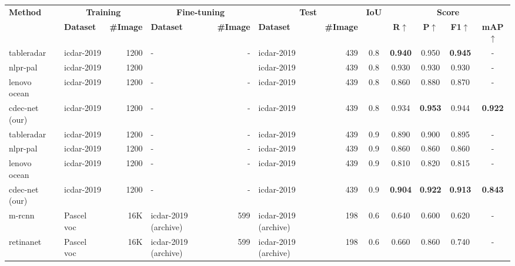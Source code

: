 \documentclass[a4paper,conference]{IEEEtran}
\begin{document}
\begin{table*}
\addtolength{\tabcolsep}{-3.1pt}
\begin{center}
\begin{tabular}{|l| l | r|l |r|l|r| c| c c c c|} \hline
\textbf{Method} &\multicolumn{2}{|c|}{\textbf{Training}} &\multicolumn{2}{|c|}{\textbf{Fine-tuning}} &\multicolumn{2}{|c|}{\textbf{Test}} &\textbf{IoU} & \multicolumn{4}{|c|}{\textbf{Score}} \\ \cline{2-7} \cline{9-12}
  &\textbf{Dataset} &\textbf{\#Image} &\textbf{Dataset} &\textbf{\#Image} &\textbf{Dataset} &\textbf{\#Image} &  &\textbf{R}$\uparrow$ &\textbf{P}$\uparrow$ &\textbf{F1}$\uparrow$ &\textbf{mAP}$\uparrow$ \\ \hline  
{\sc t}able{\sc r}adar~\cite{gao2019icdar} &{\sc icdar}-2019 &1200 &- &- &{\sc icdar}-2019 &439 &0.8 &\textbf{0.940} &0.950 &\textbf{0.945} &- \\
{\sc nlpr-pal}~\cite{gao2019icdar} &{\sc icdar}-2019 &1200 & & &{\sc icdar}-2019 &439 &0.8 &0.930 &0.930 &0.930 &- \\
{\sc l}enovo {\sc o}cean~\cite{gao2019icdar} &{\sc icdar}-2019 &1200 &- &- &{\sc icdar}-2019 &439 &0.8 &0.860 &0.880 &0.870 &- \\ 
{\sc cd}e{\sc c-n}et (our) &{\sc icdar}-2019 &1200 &- &- &{\sc icdar}-2019 &439 &0.8 &0.934 &\textbf{0.953} &0.944 &\textbf{0.922} \\ 
\hhline{|=|=|=|=|=|=|=|=|====|}
{\sc t}able{\sc r}adar~\cite{gao2019icdar} &{\sc icdar}-2019 &1200 &- &- &{\sc icdar}-2019 &439 &0.9 &0.890 &0.900 &0.895 &- \\
{\sc nlpr-pal}~\cite{gao2019icdar} &{\sc icdar}-2019 &1200 &- &- &{\sc icdar}-2019 &439 &0.9 &0.860 &0.860 &0.860 &- \\
{\sc l}enovo {\sc o}cean~\cite{gao2019icdar} &{\sc icdar}-2019 &1200 &- &- &{\sc icdar}-2019 &439 &0.9 &0.810 &0.820 &0.815 &- \\ 
{\sc cd}e{\sc c-n}et (our) &{\sc icdar}-2019 &1200 &- &- &{\sc icdar}-2019 &439 &0.9 &\textbf{0.904} &\textbf{0.922} &\textbf{0.913} &\textbf{0.843} \\ 
\hhline{|=|=|=|=|=|=|=|=|====|}
{\sc m-rcnn}~\cite{casado2019benefits} &Pascel {\sc voc} &16K &{\sc icdar}-2019 (archive) &599 &{\sc icdar}-2019 (archive) &198 &0.6 &0.640 &0.600 &0.620 &- \\
{\sc r}etina{\sc n}et~\cite{casado2019benefits} &Pascel {\sc voc} &16K &{\sc icdar}-2019 (archive) &599 &{\sc icdar}-2019 (archive) &198 &0.6 &0.660 &0.860 &0.740 &- \\

\end{tabular}
\end{center}
\end{table*}
\end{document}
